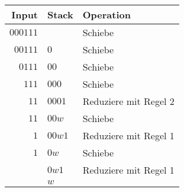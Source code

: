 \begin{center}
\begin{tabular}{|r|l|l|}
\hline
Input&Stack&Operation\\
\hline
$000111$&&Schiebe\\
$00111$&$0$&Schiebe\\
$0111$&$00$&Schiebe\\
$111$&$000$&Schiebe\\
$11$&$0001$&Reduziere mit Regel 2\\
$11$&$00w$&Schiebe\\
$1$&$00w1$&Reduziere mit Regel 1\\
$1$&$0w$&Schiebe\\
&$0w1$&Reduziere mit Regel 1\\
&$w$&\\
\hline
\end{tabular}
\end{center}
